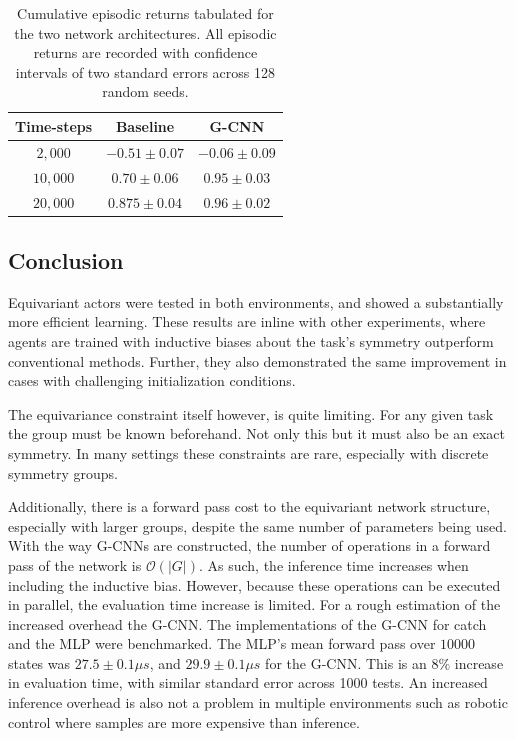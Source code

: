 \begin{table}
	\centering
	\begin{tabular}{|c|c|c|}
		\hline
		Time-steps & Baseline         & G-CNN                     \\
		\hline
		$2, 000$   & $- 0.51\pm 0.07$ & $\mathbf{-0.06 \pm 0.09}$ \\
		$10, 000$  & $0.70 \pm 0.06$  & $\mathbf{0.95 \pm 0.03} $ \\
		$20,000$   & $0.875 \pm 0.04$ & $\mathbf{0.96\pm 0.02}$   \\
		\hline
	\end{tabular}
	\caption{Cumulative episodic returns tabulated for the two network architectures. All episodic returns are recorded with confidence intervals of two standard errors across 128 random seeds.}
	\label{tab:actor-critic_catch}
\end{table}
\subsection{Conclusion}
Equivariant actors were tested in both environments, and showed a substantially more efficient learning. These results are inline with other experiments, where agents are trained with inductive biases about the task's symmetry outperform conventional methods. Further, they also demonstrated the same improvement in cases with challenging initialization conditions.

The equivariance constraint itself however, is quite limiting. For any given task the group must be known beforehand. Not only this but it must also be an exact symmetry. In many settings these constraints are rare, especially with discrete symmetry groups.

Additionally, there is a forward pass cost to the equivariant network structure, especially with larger groups, despite the same number of parameters being used. With the way G-CNNs are constructed, the number of operations in a forward pass of the network is $\mathcal{O}(|G|)$. As such, the inference time increases when including the inductive bias. However, because these operations can be executed in parallel, the evaluation time increase is limited. For a rough estimation of the increased overhead the G-CNN. The implementations of the G-CNN for catch and the MLP were benchmarked. The MLP's mean forward pass over $10000$ states was $27.5 \pm 0.1\mu s$, and $29.9 \pm 0.1 \mu s$ for the G-CNN. This is an $8\%$ increase in evaluation time, with similar standard error across 1000 tests. An increased inference overhead is also not a problem in multiple environments such as robotic control where samples are more expensive than inference.

